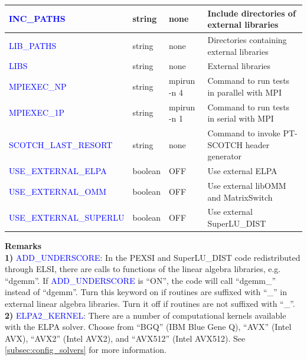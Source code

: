 \documentclass{report}
\begin{document}
\begin{tabular}[]{|p{50mm}|p{15mm}|p{20mm}|p{80mm}|}
\hline
\textcolor{blue}{INC\_PATHS}                 & string  & none        & Include directories of external libraries\\
\hline
\textcolor{blue}{LIB\_PATHS}                 & string  & none        & Directories containing external libraries\\
\hline
\textcolor{blue}{LIBS}                       & string  & none        & External libraries\\
\hline
\textcolor{blue}{MPIEXEC\_NP}                & string  & mpirun -n 4 & Command to run tests in parallel with MPI\\
\hline
\textcolor{blue}{MPIEXEC\_1P}                & string  & mpirun -n 1 & Command to run tests in serial with MPI\\
\hline
\textcolor{blue}{SCOTCH\_LAST\_RESORT}       & string  & none        & Command to invoke PT-SCOTCH header generator\\
\hline
\textcolor{blue}{USE\_EXTERNAL\_ELPA}        & boolean & OFF         & Use external ELPA\\
\hline
\textcolor{blue}{USE\_EXTERNAL\_OMM}         & boolean & OFF         & Use external libOMM and MatrixSwitch\\
\hline
\textcolor{blue}{USE\_EXTERNAL\_SUPERLU}     & boolean & OFF         & Use external SuperLU\_DIST\\
\hline
\end{tabular}

\newpage
\textbf{Remarks}\\

\textbf{1)} \textcolor{blue}{ADD\_UNDERSCORE}:  In the PEXSI and SuperLU\_DIST code redistributed through ELSI, there are calls to functions of the linear algebra libraries, e.g. ``dgemm''.  If \textcolor{blue}{ADD\_UNDERSCORE} is ``ON'', the code will call ``dgemm\_'' instead of ``dgemm''.  Turn this keyword on if routines are suffixed with ``\_'' in external linear algebra libraries.  Turn it off if routines are not suffixed with ``\_''.\\

\textbf{2)} \textcolor{blue}{ELPA2\_KERNEL}:  There are a number of computational kernels available with the ELPA solver.  Choose from ``BGQ'' (IBM Blue Gene Q), ``AVX'' (Intel AVX), ``AVX2'' (Intel AVX2), and ``AVX512'' (Intel AVX512).  See \ref{subsec:config_solvers} for more information.\\
\end{document}
